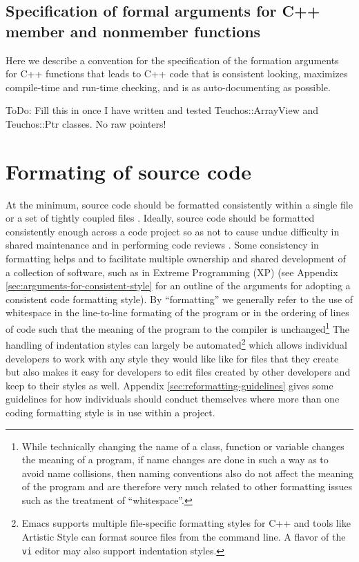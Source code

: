 %
\subsection{Specification of formal arguments for C++ member and nonmember functions}
%

Here we describe a convention for the specification of the formation arguments
for C++ functions that leads to C++ code that is consistent looking, maximizes
compile-time and run-time checking, and is as auto-documenting as possible.

ToDo: Fill this in once I have written and tested Teuchos\-::ArrayView and
Teuchos\-::Ptr classes.  No raw pointers!
%
\section{Formating of source code}
\label{thyracodingguidelines:formatting:sec}
%

At the minimum, source code should be formatted consistently within a single
file or a set of tightly coupled files {}\cite[Item 0]{C++CodingStandards05}.
Ideally, source code should be formatted consistently enough across a code
project so as not to cause undue difficulty in shared maintenance and in
performing code reviews {}\cite{CodeComplete2nd04}.  Some consistency in
formatting helps and to facilitate multiple ownership and shared development
of a collection of software, such as in Extreme Programming (XP)
{}\cite{ExtremeProgrammingExplained99} (see Appendix
{}\ref{sec:arguments-for-consistent-style} for an outline of the arguments for
adopting a consistent code formatting style).  By ``formatting'' we generally
refer to the use of whitespace in the line-to-line formating of the program or
in the ordering of lines of code such that the meaning of the program to the
compiler is unchanged\footnote{While technically changing the name of a class,
function or variable changes the meaning of a program, if name changes are
done in such a way as to avoid name collisions, then naming conventions also
do not affect the meaning of the program and are therefore very much related
to other formatting issues such as the treatment of ``whitespace''.}  The
handling of indentation styles can largely be automated\footnote{Emacs
supports multiple file-specific formatting styles for C++ and tools like
Artistic Style {}\cite{ArtisticStyle} can format source files from the command
line.  A flavor of the {}\texttt{vi} editor may also support indentation
styles. } which allows individual developers to work with any style they would
like like for files that they create but also makes it easy for developers to
edit files created by other developers and keep to their styles as well.
Appendix {}\ref{sec:reformatting-guidelines} gives some guidelines for how
individuals should conduct themselves where more than one coding formatting
style is in use within a project.

